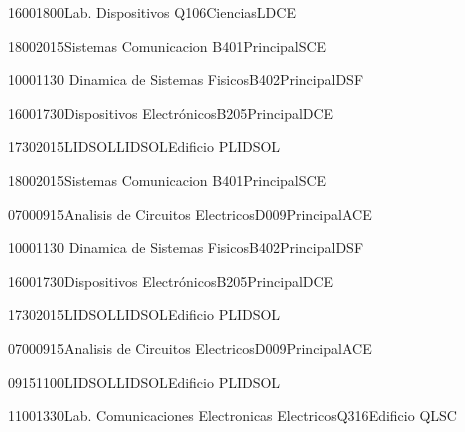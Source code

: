 \documentclass[a4paper,10pt]{report}
\begin{document}
\begin{landscape}
\begin{timetable}
  
    {1600}{1800}{Lab. Dispositivos }{Q106}{{\tiny Ciencias}}{LDCE}
   
    {1800}{2015}{Sistemas Comunicacion }{B401}{{\tiny Principal}}{SCE}
   
   
   
   
   
   
   
   
    {1000}{1130}{ Dinamica de Sistemas Fisicos}{B402}{{\tiny Principal}}{DSF}
   
    {1600}{1730}{Dispositivos  Electrónicos}{B205}{{\tiny  Principal}}{DCE}
   
  {1730}{2015}{LIDSOL}{LIDSOL}{{\tiny Edificio P}}{LIDSOL}
 
 
 
   
   
   
  
    {1800}{2015}{Sistemas Comunicacion }{B401}{{\tiny Principal}}{SCE}
   
   
   

 {0700}{0915}{Analisis de Circuitos Electricos}{D009}{{\tiny Principal}}{ACE}

  {1000}{1130}{ Dinamica de Sistemas Fisicos}{B402}{{\tiny Principal}}{DSF}
 
  {1600}{1730}{Dispositivos  Electrónicos}{B205}{{\tiny  Principal}}{DCE}
 
  {1730}{2015}{LIDSOL}{LIDSOL}{{\tiny Edificio P}}{LIDSOL}
   
     
   
   
   
   {0700}{0915}{Analisis de Circuitos Electricos}{D009}{{\tiny Principal}}{ACE}
  
   {0915}{1100}{LIDSOL}{LIDSOL}{{\tiny Edificio P}}{LIDSOL}
   
  
   {1100}{1330}{Lab. Comunicaciones Electronicas Electricos}{Q316}{{\tiny Edificio Q}}{LSC}
  
    
   
 \end{timetable}
 \end{landscape}
 
\end{document}
